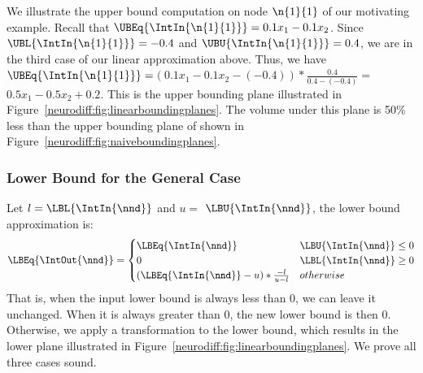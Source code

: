 We illustrate the upper bound computation on node $ \n{1}{1} $ of our
motivating example. Recall that $ \UBEq{\IntIn{\n{1}{1}}} = 0.1x_1 -
0.1x_2 $. Since $ \UBL{\IntIn{\n{1}{1}}} = -0.4 $ and
$ \UBU{\IntIn{\n{1}{1}}} = 0.4 $, we are in the third case of our
linear approximation above. Thus, we have $ \UBEq{\IntIn{\n{1}{1}}}
= $$ ( 0.1x_1 - 0.1x_2 - (-0.4))*\frac{0.4}{0.4 - (-0.4)} = $$ 0.5x_1
- 0.5x_2 + 0.2 $. This is the upper bounding plane illustrated in
Figure~\ref{neurodiff:fig:linearboundingplanes}. The volume under this plane is
50\% less
than the upper bounding plane of \ReluDiff{} shown in
Figure~\ref{neurodiff:fig:naiveboundingplanes}.



\subsubsection{Lower Bound for the General Case}
\label{neurodiff:sec:lower}

Let $ l = \LBL{\IntIn{\nnd}} $ and $ u = $ $ \LBU{\IntIn{\nnd}} $, the
lower bound approximation  is:
\[
\LBEq{\IntOut{\nnd}} = \begin{cases}
\LBEq{\IntIn{\nnd}} 	& 		\LBU{\IntIn{\nnd}} \leq 0\\
0 				& 		\LBL{\IntIn{\nnd}} \geq 0 \\
(\LBEq{\IntIn{\nnd}} - u)*\frac{-l}{u - l} & otherwise
\end{cases}
\]
That is, when the input lower bound is always less than 0, we can
leave it unchanged. When it is always greater than 0, the new lower
bound is then 0.  Otherwise, we apply a transformation to the lower
bound, which results in the lower plane illustrated in
Figure~\ref{neurodiff:fig:linearboundingplanes}. We prove all three cases sound.


